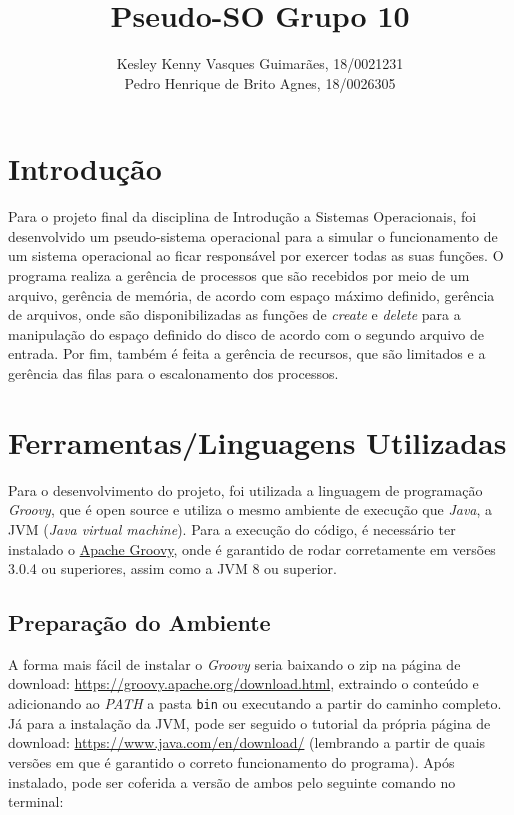 \documentclass[12pt]{article}
\title{Pseudo-SO Grupo 10}
\author{Kesley Kenny Vasques Guimarães, 18/0021231 \\
Pedro Henrique de Brito Agnes, 18/0026305}
\affil{Dep. Ciência da Computação - Universidade de Brasília (UnB)}
\date{}
\begin{document}
 
\maketitle

\section{Introdução}
Para o projeto final da disciplina de Introdução a Sistemas Operacionais, foi desenvolvido um pseudo-sistema operacional para a simular o funcionamento de um sistema operacional ao ficar responsável por exercer todas as suas funções. O programa realiza a gerência de processos que são recebidos por meio de um arquivo, gerência de memória, de acordo com espaço máximo definido, gerência de arquivos, onde são disponibilizadas as funções de \textit{create} e \textit{delete} para a manipulação do espaço definido do disco de acordo com o segundo arquivo de entrada. Por fim, também é feita a gerência de recursos, que são limitados e a gerência das filas para o escalonamento dos processos.

\section{Ferramentas/Linguagens Utilizadas}
Para o desenvolvimento do projeto, foi utilizada a linguagem de programação \textit{Groovy}, que é open source e utiliza o mesmo ambiente de execução que \textit{Java}, a JVM (\textit{Java virtual machine}). Para a execução do código, é necessário ter instalado o \href{https://groovy.apache.org/download.html}{Apache Groovy}, onde é garantido de rodar corretamente em versões 3.0.4 ou superiores, assim como a JVM 8 ou superior. 

\subsection{Preparação do Ambiente}
A forma mais fácil de instalar o \textit{Groovy} seria baixando o zip na página de download: \url{https://groovy.apache.org/download.html}, extraindo o conteúdo e adicionando ao \textit{PATH} a pasta \texttt{bin} ou executando a partir do caminho completo. Já para a instalação da JVM, pode ser seguido o tutorial da própria página de download: \url{https://www.java.com/en/download/} (lembrando a partir de quais versões em que é garantido o correto funcionamento do programa). Após instalado, pode ser coferida a versão de ambos pelo seguinte comando no terminal:
\end{document}
